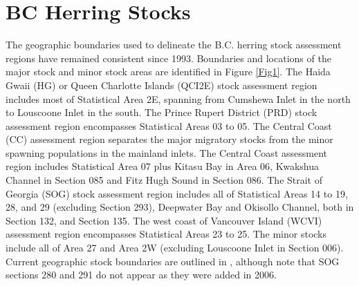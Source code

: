 \section{BC Herring Stocks}
The geographic boundaries used to delineate the B.C. herring stock assessment regions have remained consistent since 1993.  Boundaries and locations of the major stock and minor stock areas are identified in Figure \ref{Fig1}.  The Haida Gwaii (HG) or Queen Charlotte Islands (QCI2E) stock assessment region includes most of Statistical Area 2E, spanning from Cumshewa Inlet in the north to Louscoone Inlet in the south.  The Prince Rupert District (PRD) stock assessment region encompasses Statistical Areas 03 to 05.  The Central Coast (CC) assessment region separates the major migratory stocks from the minor spawning populations in the mainland inlets.  The Central Coast assessment region includes Statistical Area 07 plus Kitasu Bay in Area 06, Kwakshua Channel in Section 085 and Fitz Hugh Sound in Section 086.  The Strait of Georgia (SOG) stock assessment region includes all of Statistical Areas 14 to 19, 28, and 29 (excluding Section 293), Deepwater Bay and Okisollo Channel, both in Section 132, and Section 135.  The west coast of Vancouver Island (WCVI) assessment region encompasses Statistical Areas 23 to 25.  The minor stocks include all of Area 27 and Area 2W (excluding Louscoone Inlet in Section 006).  Current geographic stock boundaries are outlined in \cite{Midgley:2003fk}, although note that SOG sections 280 and 291 do not appear as they were added in 2006.

